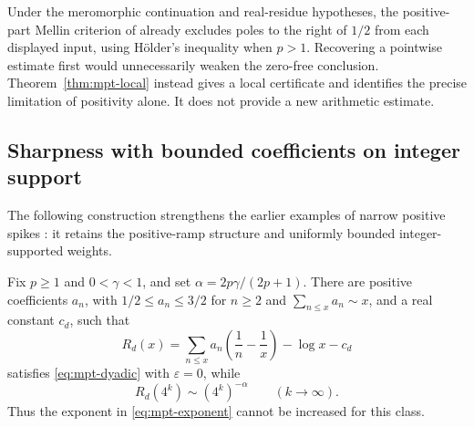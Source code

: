 \begin{remark}
Under the meromorphic continuation and real-residue hypotheses,
the positive-part Mellin criterion of \cite{priorMean} already excludes
poles to the right of $1/2$ from each displayed input, using H\"older's
inequality when $p>1$. Recovering a pointwise estimate first would
unnecessarily weaken the zero-free conclusion. Theorem~\ref{thm:mpt-local}
instead gives a local certificate and identifies the precise limitation
of positivity alone. It does not provide a new arithmetic estimate.
\end{remark}

\subsection{Sharpness with bounded coefficients on integer support}

The following construction strengthens the earlier examples of narrow
positive spikes \cite{priorMean}: it retains the positive-ramp structure
and uniformly bounded integer-supported weights.

\begin{proposition}
\label{prop:mpt-sharp}
Fix $p\ge1$ and $0<\gamma<1$, and set
$\alpha=2p\gamma/(2p+1)$. There are positive coefficients $a_n$,
with $1/2\le a_n\le3/2$ for $n\ge2$ and
$\sum_{n\le x}a_n\sim x$, and a real constant $c_d$, such that
\[
 R_d(x)=\sum_{n\le x}a_n\left(\frac1n-\frac1x\right)-\log x-c_d
\]
satisfies \eqref{eq:mpt-dyadic} with $\varepsilon=0$, while
\[
 R_d(4^k)\sim(4^k)^{-\alpha}\qquad(k\to\infty).
\]
Thus the exponent in \eqref{eq:mpt-exponent} cannot be increased
for this class.
\end{proposition}

